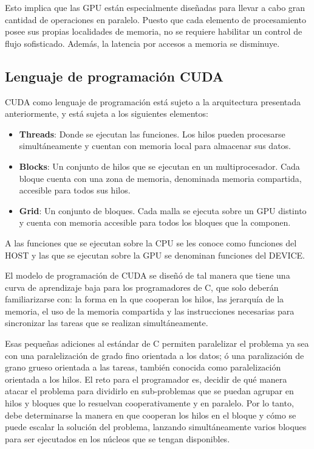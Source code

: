 Esto implica que las GPU están especialmente diseñadas para llevar a cabo 
gran cantidad de operaciones en paralelo. Puesto que cada elemento de 
procesamiento posee sus propias localidades de memoria, no se requiere habilitar 
un control de flujo sofisticado. Además, la latencia por accesos a memoria se 
disminuye.

\newpage
\subsection{Lenguaje de programación CUDA}

CUDA como lenguaje de programación está sujeto a la arquitectura presentada anteriormente, y está sujeta a los siguientes elementos:
\begin{itemize}
 \item \textbf{Threads}: Donde se ejecutan las funciones. Los hilos pueden 
procesarse simultáneamente y cuentan con memoria local para almacenar 
sus datos.
 \item \textbf{Blocks}: Un conjunto de hilos que se ejecutan en un 
multiprocesador. Cada bloque cuenta con una zona de memoria, 
denominada memoria compartida, accesible para todos sus hilos.
 \item \textbf{Grid}:  Un conjunto de bloques. Cada malla se ejecuta sobre un GPU 
distinto y cuenta con memoria accesible para todos los bloques que la 
componen.
\end{itemize}

A las funciones que se ejecutan sobre la CPU se les conoce como funciones del 
HOST y las que se ejecutan sobre la GPU se denominan funciones del DEVICE.


El modelo de programación de CUDA se diseñó de tal manera que tiene una curva 
de aprendizaje baja para los programadores de C, que solo deberán familiarizarse 
con: la forma en la que cooperan los hilos, las jerarquía de la memoria, el uso de la memoria compartida y las instrucciones necesarias para sincronizar las tareas que se realizan simultáneamente.

Esas pequeñas adiciones al estándar de C permiten paralelizar el problema ya sea 
con una paralelización de grado fino orientada a los datos; ó una 
paralización de grano grueso orientada a las tareas, también conocida como
paralelización orientada a los hilos. El reto para el programador es, decidir de qué manera atacar el problema para dividirlo en sub-problemas que se puedan agrupar en hilos y bloques que lo resuelvan cooperativamente y en paralelo.
Por lo tanto, debe determinarse la manera en que cooperan los hilos en el bloque y cómo se puede escalar la solución del problema, lanzando simultáneamente varios bloques para ser ejecutados en los núcleos que se tengan disponibles.
